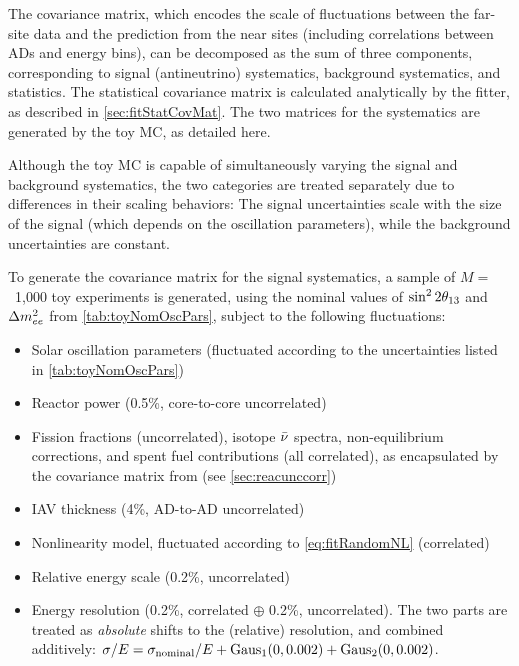 \documentclass[../thesis.tex]{subfiles}
\begin{document}
The covariance matrix, which encodes the scale of fluctuations between the far-site data and the prediction from the near sites (including correlations between ADs and energy bins), can be decomposed as the sum of three components, corresponding to signal (antineutrino) systematics, background systematics, and statistics. The statistical covariance matrix is calculated analytically by the fitter, as described in \autoref{sec:fitStatCovMat}. The two matrices for the systematics are generated by the toy MC, as detailed here.

Although the toy MC is capable of simultaneously varying the signal and background systematics, the two categories are treated separately due to differences in their scaling behaviors: The signal uncertainties scale with the size of the signal (which depends on the oscillation parameters), while the background uncertainties are constant.

To generate the covariance matrix for the signal systematics, a sample of $M =$~1,000 toy experiments is generated, using the nominal values of $\sin^2 2\theta_{13}$ and $\Delta m^2_{ee}$ from \autoref{tab:toyNomOscPars}, subject to the following fluctuations:

\begin{itemize}
\item Solar oscillation parameters (fluctuated according to the uncertainties listed in \autoref{tab:toyNomOscPars})
\item Reactor power (0.5\%, core-to-core uncorrelated)
\item Fission fractions (uncorrelated), isotope $\bar\nu$ spectra, non-equilibrium corrections, and spent fuel contributions (all correlated), as encapsulated by the covariance matrix from \cite{Lewis} (see \autoref{sec:reacunccorr})
\item IAV thickness (4\%, AD-to-AD uncorrelated)
\item Nonlinearity model, fluctuated according to \autoref{eq:fitRandomNL} (correlated)
\item Relative energy scale (0.2\%, uncorrelated)
\item Energy resolution (0.2\%, correlated $\oplus$ 0.2\%, uncorrelated). The two parts are treated as \emph{absolute} shifts to the (relative) resolution, and combined additively: $\sigma/E = \sigma_{\mathrm{nominal}}/E + \operatorname{Gaus}_1(0, 0.002) + \operatorname{Gaus}_2(0, 0.002)$.
\end{itemize}
\end{document}
